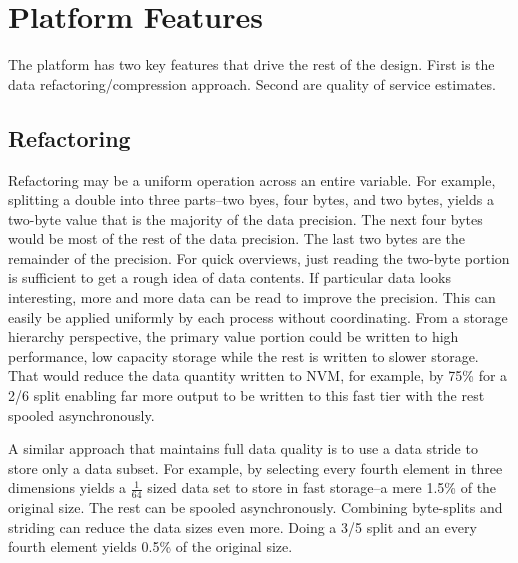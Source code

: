 \documentclass[letterpaper,twocolumn,10pt]{article}
\begin{document}
\section{Platform Features}
\label{sec:features}

The platform has two key features that drive the rest of the design. First is
the data refactoring/compression approach. Second are quality of service
estimates. 

\subsection{Refactoring}
Refactoring may be a uniform operation across an entire variable. For example,
splitting a double into three parts--two byes, four bytes, and two bytes,
yields a two-byte value that is the majority of the data precision. The next
four bytes would be most of the rest of the data precision. The last two bytes
are the remainder of the precision. For quick overviews, just reading the
two-byte portion is sufficient to get a rough idea of data contents. If
particular data looks interesting, more and more data can be read to improve
the precision. This can easily be applied uniformly by each process without
coordinating. From a storage hierarchy perspective, the primary value portion
could be written to high performance, low capacity storage while the rest is
written to slower storage. That would reduce the data quantity written to NVM,
for example, by 75\% for a 2/6 split enabling far more output to be written to
this fast tier with the rest spooled asynchronously.

A similar approach that maintains full data quality is to use a data stride to
store only a data subset. For example, by selecting every fourth element in
three dimensions yields a $\frac{1}{64}$ sized data set to store in fast
storage--a mere 1.5\% of the original size. The rest can be spooled
asynchronously. Combining byte-splits and striding can reduce the data sizes
even more. Doing a 3/5 split and an every fourth element yields 0.5\% of the
original size.
\end{document}
